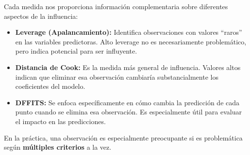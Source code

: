 \documentclass[
  letterpaper,
  DIV=11,
  numbers=noendperiod]{scrreprt}
\begin{document}
Cada medida nos proporciona información complementaria sobre diferentes
aspectos de la influencia:

\begin{itemize}
\item
  \textbf{Leverage (Apalancamiento):} Identifica observaciones con
  valores ``raros'' en las variables predictoras. Alto leverage no es
  necesariamente problemático, pero indica potencial para ser
  influyente.
\item
  \textbf{Distancia de Cook:} Es la medida más general de influencia.
  Valores altos indican que eliminar esa observación cambiaría
  substancialmente los coeficientes del modelo.
\item
  \textbf{DFFITS:} Se enfoca específicamente en cómo cambia la
  predicción de cada punto cuando se elimina esa observación. Es
  especialmente útil para evaluar el impacto en las predicciones.
\end{itemize}

En la práctica, una observación es especialmente preocupante si es
problemática según \textbf{múltiples criterios} a la vez.
\end{document}
